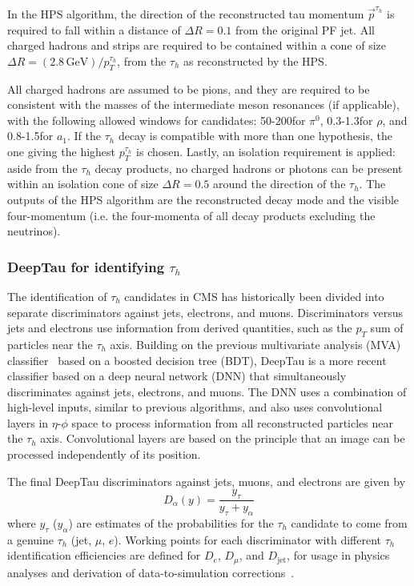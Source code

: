 In the HPS algorithm, the direction of the reconstructed tau momentum $\vec{p}^{\tau_{h}}$ is required to fall within a distance of $\Delta R = 0.1$ from the original PF jet. All charged hadrons and strips are required to be contained within a cone of size $\Delta R = (2.8 \,\text{GeV})/p_{T}^{\tau_{h}}$, from the $\tau_{h}$ as reconstructed by the HPS. 

All charged hadrons are assumed to be pions, and they are required to be consistent with the masses of the intermediate meson resonances (if applicable), with the following allowed windows for candidates: 50-200\MeV for $\pi^0$, 0.3-1.3\GeV for $\rho$, and 0.8-1.5\GeV for $a_1$. If the $\tau_{h}$ decay is compatible with more than one hypothesis, the one giving the highest $p_{T}^{\tau_{h}}$ is chosen. Lastly, an isolation requirement is applied: aside from the $\tau_{h}$ decay products, no charged hadrons or photons can be present within an isolation cone of size $\Delta R = 0.5$ around the direction of the $\tau_{h}$. The outputs of the HPS algorithm are the reconstructed decay mode and the visible four-momentum (i.e. the four-momenta of all decay products excluding the neutrinos).

\subsubsection{DeepTau for identifying \texorpdfstring{$\tau_{h}$}{tauh}}
The identification of $\tau_{h}$ candidates in CMS has historically been divided into separate discriminators against jets, electrons, and muons. Discriminators versus jets and electrons use information from derived quantities, such as the $p_{T}$ sum of particles near the $\tau_{h}$ axis. Building on the previous multivariate analysis (MVA) classifier~\cite{CMS-TAU-16-003} based on a boosted decision tree (BDT), DeepTau is a more recent classifier based on a deep neural network (DNN) that simultaneously discriminates against jets, electrons, and muons. The DNN uses a combination of high-level inputs, similar to previous algorithms, and also uses convolutional layers in $\eta$-$\phi$ space to process information from all reconstructed particles near the $\tau_{h}$ axis. Convolutional layers are based on the principle that an image can be processed independently of its position. 

The final DeepTau discriminators against jets, muons, and electrons are given by 
\begin{equation}
    D_\alpha(y) = \frac{y_{\tau}}{y_{\tau} + y_{\alpha}}
\end{equation}
where $y_\tau$ ($y_\alpha$) are estimates of the probabilities for the $\tau_{h}$ candidate to come from a genuine $\tau_{h}$ (jet, $\mu$, $e$). Working points for each discriminator with different $\tau_{h}$ identification efficiencies are defined for $D_{e}$, $D_{\mu}$, and $D_{\text{jet}}$, for usage in physics analyses and derivation of data-to-simulation corrections~\cite{2022-PRD-DeepTau}. 

